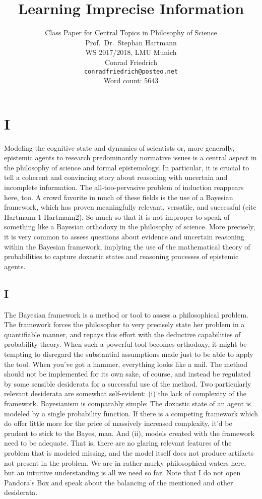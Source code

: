 \documentclass[11pt, a4paper]{scrartcl}
\title{\osfamily{}Learning Imprecise Information}
\author{Class Paper for Central Topics in Philosophy of Science \\ Prof.\ Dr.\ Stephan Hartmann \\ WS 2017/2018, LMU Munich \\ Conrad Friedrich \\ \texttt{conradfriedrich@posteo.net} \\ Word count: 5643}
\begin{document}
\maketitle
\thispagestyle{empty}
\newpage
\section{I}
Modeling the cognitive state and dynamics of scientists or, more generally, epistemic agents to research predominantly normative issues is a central aspect in the philosophy of science and formal epistemology. In particular, it is crucial to tell a coherent and convincing story about reasoning with uncertain and incomplete information. The all-too-pervasive problem of induction reappears here, too. A crowd favorite in much of these fields is the use of a Bayesian framework, which has proven meaningfully relevant, versatile, and successful (cite Hartmann 1 Hartmann2). So much so that it is not improper to speak of something like a Bayesian orthodoxy in the philosophy of science. More precisely, it is very common to assess questions about evidence and uncertain reasoning within the Bayesian framework, implying the use of the mathematical theory of probabilities to capture doxastic states and reasoning processes of epistemic agents.

\subsection{I}
The Bayesian framework is a method or tool to assess a philosophical problem. The framework forces the philosopher to very precisely state her problem in a quantifiable manner, and repays this effort with the deductive capabilities of probability theory. When such a powerful tool becomes orthodoxy, it might be tempting to disregard the substantial assumptions made just to be able to apply the tool. When you've got a hammer, everything looks like a nail. The method should not be implemented for its own sake, of course, and instead be regulated by some sensible desiderata for a successful use of the method. Two particularly relevant desiderata are somewhat self-evident: (i) the lack of complexity of the framework. Bayesianism is comparably simple: The doxastic state of an agent is modeled by a single probability function. If there is a competing framework which do offer little more for the price of massively increased complexity, it'd be prudent to stick to the Bayes, man. And (ii), models created with the framework need to be adequate. That is, there are no glaring relevant features of the problem that is modeled missing, and the model itself does not produce artifacts not present in the problem. We are in rather murky philosophical waters here, but an intuitive understanding is all we need so far. Note that I do not open Pandora's Box and speak about the balancing of the mentioned and other desiderata.
\end{document}
